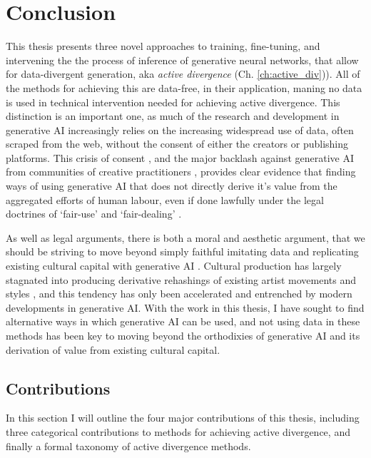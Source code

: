 \chapter{Conclusion}
\label{ch:conclusion}

This thesis presents three novel approaches to training, fine-tuning, and intervening the the process of inference of generative neural networks, that allow for data-divergent generation, aka \textit{active divergence} (Ch. \ref{ch:active_div})).
All of the methods for achieving this are data-free, in their application, maning no data is used in technical intervention needed for achieving active divergence.
This distinction is an important one, as much of the research and development in generative AI increasingly relies on the increasing widespread use of data, often scraped from the web, without the consent of either the creators or publishing platforms.
This crisis of consent \citep{longpre2024consent}, and the major backlash against generative AI from communities of creative practitioners \citep{whiddington2022backlash}, provides clear evidence that finding ways of using generative AI that does not directly derive it's value from the aggregated efforts of human labour, even if done lawfully under the legal doctrines of `fair-use' \citep{sobel2017artificial,alhadeff2024limits} and `fair-dealing' \citep{guadamuz2023scanner}.

As well as legal arguments, there is both a moral and aesthetic argument, that we should be striving to move beyond simply faithful imitating data and replicating existing cultural capital with generative AI \citep{rafferty2016future}. 
Cultural production has largely stagnated into producing derivative rehashings of existing artist movements and styles \citep{fisher2009capitalist}, and this tendency has only been accelerated and entrenched by modern developments in generative AI.
With the work in this thesis, I have sought to find alternative ways in which generative AI can be used, and not using data in these methods has been key to moving beyond the orthodixies of generative AI and its derivation of value from existing cultural capital.

\section{Contributions}

In this section I will outline the four major contributions of this thesis, including three categorical contributions to methods for achieving active divergence, and finally a formal taxonomy of active divergence methods.

